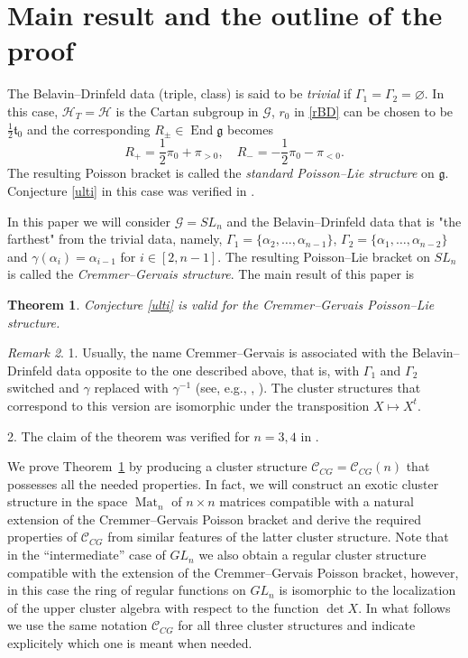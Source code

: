 \documentclass{amsart}
\newtheorem{theorem}{Theorem}
\theoremstyle{definition}
\theoremstyle{remark}
\newtheorem{remark}[theorem]{Remark}
\numberwithin{equation}{section}
\numberwithin{theorem}{section}
\begin{document}
\section{Main result and the outline of the proof}
The Belavin--Drinfeld data (triple, class) is said to be {\it trivial\/} if $\Gamma_1=\Gamma_2=\varnothing$.
In this case,   ${\mathcal H}_T={\mathcal H}$ is the Cartan
subgroup in ${{\mathcal G}}$, $r_0$ in \eqref{rBD} can be chosen to be $\frac{1}{2} \mathfrak{t}_0$ and the corresponding 
$R_\pm\in {\operatorname{End}}{\mathfrak g}$ becomes
$$
R_+=\frac{1}{2} \pi_{0} +  \pi_{> 0},\quad  R_-=-\frac{1}{2} \pi_{0} -  \pi_{< 0}.
$$
The resulting Poisson bracket is called   the {\it standard Poisson--Lie structure\/} on ${\mathfrak g}$.
Conjecture \ref{ulti} in this case was verified in \cite{GSVMMJ}.

In this paper we will consider ${{\mathcal G}}=SL_n$ and the Belavin--Drinfeld data that is "the farthest" from the 
trivial data, namely, $\Gamma_1=\{\alpha_2, \dots, \alpha_{n-1}\}$,  
 $\Gamma_2=\{\alpha_1, \dots, \alpha_{n-2}\}$ and $\gamma(\alpha_i) = \alpha_{i-1}$
for $i\in [2,n-1]$.  The resulting Poisson--Lie bracket on $SL_n$ is called the
{\em Cremmer--Gervais structure\/}. The main result of this paper is

\begin{theorem}\label{CGtrue}
Conjecture {\rm \ref{ulti}} is valid for the Cremmer--Gervais Poisson--Lie structure.
\end{theorem}

\begin{remark}
1. Usually, the name Cremmer--Gervais is associated with the Belavin--Drinfeld data 
opposite to the one described above, that is, with $\Gamma_1$ and $\Gamma_2$ switched and $\gamma$ 
replaced with $\gamma^{-1}$ (see, e.g., \cite{CrGe}, \cite{Ho}). The cluster structures that 
correspond to this version are isomorphic under the transposition $X\mapsto X^t$.

2. The claim of the theorem was verified for $n=3,4$ in \cite{GSVMMJ}.
\end{remark}

We prove Theorem~\ref{CGtrue} by producing a cluster structure ${{\mathcal C}}_{CG}={{\mathcal C}}_{CG}(n)$ that possesses all the
needed properties. In fact, we will construct an exotic cluster structure in the space ${\operatorname{Mat}}_n$ of 
$n\times n$ matrices compatible with a natural extension of the Cremmer--Gervais Poisson bracket and derive the 
required properties of ${{\mathcal C}}_{CG}$ from similar features of the latter cluster structure. Note that in the ``intermediate'' case of $GL_n$ we also obtain a regular cluster structure compatible
with the extension of the Cremmer--Gervais Poisson bracket, however, in this case the ring of regular functions on $GL_n$ is isomorphic to the localization of the upper cluster algebra with respect to the function $\det X$.
In what follows we use the same notation ${{\mathcal C}}_{CG}$ for all three cluster structures and indicate explicitely which
one is meant when needed. 
\end{document}
